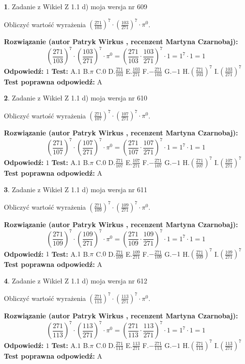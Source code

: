 \documentclass[12pt, a4paper]{article}
\theoremstyle{definition} %
\newtheorem{zad}{}
\newcommand{\zadStart}[1]{\begin{zad}#1\newline}
\newcommand{\zadStop}{\end{zad}}
\newcommand{\rozwStart}[2]{\noindent \textbf{Rozwiązanie (autor #1 , recenzent #2): }\newline}
\newcommand{\rozwStop}{\newline}
\newcommand{\odpStart}{\noindent \textbf{Odpowiedź:}\newline}
\newcommand{\odpStop}{\newline}
\newcommand{\testStart}{\noindent \textbf{Test:}\newline}
\newcommand{\testStop}{\newline}
\newcommand{\kluczStart}{\noindent \textbf{Test poprawna odpowiedź:}\newline}
\newcommand{\kluczStop}{\newline}
\begin{document}
\zadStart{Zadanie z Wikieł Z 1.1 d) moja wersja nr 609}

Obliczyć wartość wyrażenia $(\frac{271}{103})^{7} \cdot (\frac{103}{271})^{7} \cdot \pi^{0}$.
\zadStop
\rozwStart{Patryk Wirkus}{Martyna Czarnobaj}
$$(\frac{271}{103})^{7} \cdot (\frac{103}{271})^{7} \cdot \pi^{0} = (\frac{271}{103} \cdot \frac{103}{271})^{7} \cdot 1 = 1^{7} \cdot 1 = 1$$
\rozwStop
\odpStart
$1$
\odpStop
\testStart
A.$1$ B.$\pi$ C.$0$ D.$\frac{271}{103}$ E.$\frac{103}{271}$
F.$-\frac{271}{103}$ G.$-1$
H.$(\frac{271}{103})^{7}$
I.$(\frac{103}{271})^{7}$
\testStop
\kluczStart
A
\kluczStop



\zadStart{Zadanie z Wikieł Z 1.1 d) moja wersja nr 610}

Obliczyć wartość wyrażenia $(\frac{271}{107})^{7} \cdot (\frac{107}{271})^{7} \cdot \pi^{0}$.
\zadStop
\rozwStart{Patryk Wirkus}{Martyna Czarnobaj}
$$(\frac{271}{107})^{7} \cdot (\frac{107}{271})^{7} \cdot \pi^{0} = (\frac{271}{107} \cdot \frac{107}{271})^{7} \cdot 1 = 1^{7} \cdot 1 = 1$$
\rozwStop
\odpStart
$1$
\odpStop
\testStart
A.$1$ B.$\pi$ C.$0$ D.$\frac{271}{107}$ E.$\frac{107}{271}$
F.$-\frac{271}{107}$ G.$-1$
H.$(\frac{271}{107})^{7}$
I.$(\frac{107}{271})^{7}$
\testStop
\kluczStart
A
\kluczStop



\zadStart{Zadanie z Wikieł Z 1.1 d) moja wersja nr 611}

Obliczyć wartość wyrażenia $(\frac{271}{109})^{7} \cdot (\frac{109}{271})^{7} \cdot \pi^{0}$.
\zadStop
\rozwStart{Patryk Wirkus}{Martyna Czarnobaj}
$$(\frac{271}{109})^{7} \cdot (\frac{109}{271})^{7} \cdot \pi^{0} = (\frac{271}{109} \cdot \frac{109}{271})^{7} \cdot 1 = 1^{7} \cdot 1 = 1$$
\rozwStop
\odpStart
$1$
\odpStop
\testStart
A.$1$ B.$\pi$ C.$0$ D.$\frac{271}{109}$ E.$\frac{109}{271}$
F.$-\frac{271}{109}$ G.$-1$
H.$(\frac{271}{109})^{7}$
I.$(\frac{109}{271})^{7}$
\testStop
\kluczStart
A
\kluczStop



\zadStart{Zadanie z Wikieł Z 1.1 d) moja wersja nr 612}

Obliczyć wartość wyrażenia $(\frac{271}{113})^{7} \cdot (\frac{113}{271})^{7} \cdot \pi^{0}$.
\zadStop
\rozwStart{Patryk Wirkus}{Martyna Czarnobaj}
$$(\frac{271}{113})^{7} \cdot (\frac{113}{271})^{7} \cdot \pi^{0} = (\frac{271}{113} \cdot \frac{113}{271})^{7} \cdot 1 = 1^{7} \cdot 1 = 1$$
\rozwStop
\odpStart
$1$
\odpStop
\testStart
A.$1$ B.$\pi$ C.$0$ D.$\frac{271}{113}$ E.$\frac{113}{271}$
F.$-\frac{271}{113}$ G.$-1$
H.$(\frac{271}{113})^{7}$
I.$(\frac{113}{271})^{7}$
\testStop
\kluczStart
A
\kluczStop
\end{document}
